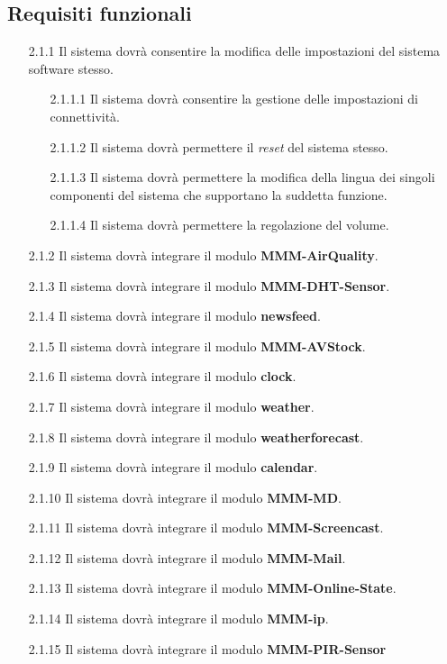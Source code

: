 \documentclass[a4paper,11pt,titlepage]{article}       %
\begin{document}
    \subsection{Requisiti funzionali}
        \begin{itemize}
            \item[2.1.1] Il sistema dovrà consentire la modifica delle impostazioni del sistema software stesso.
                \begin{itemize}
                    \item[2.1.1.1] Il sistema dovrà consentire la gestione delle impostazioni di connettività.
                    \item[2.1.1.2] Il sistema dovrà permettere il \emph{reset} del sistema stesso.
                    \item[2.1.1.3] Il sistema dovrà permettere la modifica della lingua dei singoli componenti del sistema che supportano la suddetta funzione.
                    \item[2.1.1.4] Il sistema dovrà permettere la regolazione del volume.
                \end{itemize}
            \item[2.1.2] Il sistema dovrà integrare il modulo \textbf{MMM-AirQuality}.
            \item[2.1.3] Il sistema dovrà integrare il modulo \textbf{MMM-DHT-Sensor}.
            \item[2.1.4] Il sistema dovrà integrare il modulo \textbf{newsfeed}.
            \item[2.1.5] Il sistema dovrà integrare il modulo \textbf{MMM-AVStock}.
            \item[2.1.6] Il sistema dovrà integrare il modulo \textbf{clock}.
            \item[2.1.7] Il sistema dovrà integrare il modulo \textbf{weather}.
            \item[2.1.8] Il sistema dovrà integrare il modulo \textbf{weatherforecast}.
            \item[2.1.9] Il sistema dovrà integrare il modulo \textbf{calendar}.
            \item[2.1.10] Il sistema dovrà integrare il modulo \textbf{MMM-MD}.
            \item[2.1.11] Il sistema dovrà integrare il modulo \textbf{MMM-Screencast}.
            \item[2.1.12] Il sistema dovrà integrare il modulo \textbf{MMM-Mail}.
            \item[2.1.13] Il sistema dovrà integrare il modulo \textbf{MMM-Online-State}.
            \item[2.1.14] Il sistema dovrà integrare il modulo \textbf{MMM-ip}.
            \item[2.1.15] Il sistema dovrà integrare il modulo \textbf{MMM-PIR-Sensor}
        \end{itemize}
        
\end{document}
